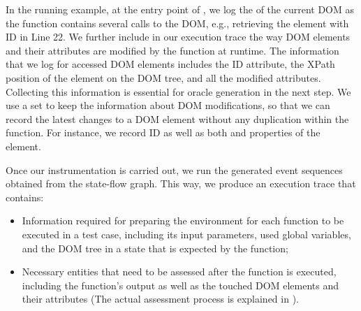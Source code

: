 In the running example, at the entry point of  , we log the  of the current DOM as the function contains several calls to the DOM, e.g., retrieving the element with ID  in Line 22. We further include in our execution trace the way DOM elements and their attributes are modified by the \javascript function at runtime. 
The information that we log for accessed DOM elements includes the ID attribute, the XPath position of the element on the DOM tree, and all the modified  attributes. Collecting this information is essential for oracle generation in the next step.
%
We use a set to keep the information about DOM modifications, so that we can record the latest changes to a DOM element without any duplication within the function. 
For instance, we record ID as well as both  and  properties of the  element. 

Once our instrumentation is carried out, we run the generated event sequences obtained from the state-flow graph. This way, we produce an execution trace that contains:
 
\begin{itemize}
\item Information required for preparing the environment for each function to be executed in a test case, including its input parameters, used global variables, and the DOM tree in a state that is expected by the function;
\item Necessary entities that need to be assessed after the function is executed, including the function's output as well as the touched DOM elements and their attributes (The actual assessment process is explained in ).
\end{itemize}


